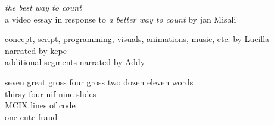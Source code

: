 \documentclass[../best.tex]{subfiles}
\begin{document}
\newpage

\vspace*{\fill}

\begin{center}
	{\it the best way to count} \\
	a video essay in response to {\it a better way to count} by jan Misali \bigskip

	concept, script, programming, visuals, animations, music, etc. by Lucilla \\
	narrated by kepe \\
	additional segments narrated by Addy \bigskip

	seven great gross four gross two dozen eleven words \\
	thirsy four nif nine slides \\
	MCIX lines of code \\
	one cute fraud
\end{center}

\vspace*{\fill}
\end{document}
